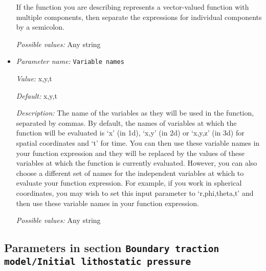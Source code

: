 \begin{itemize}
If the function you are describing represents a vector-valued function with multiple components, then separate the expressions for individual components by a semicolon.


{\it Possible values:} Any string
\item {\it Parameter name:} {\tt Variable names}
\label{parameters:Boundary traction model/Function/Variable names}


{\it Value:} x,y,t


{\it Default:} x,y,t


{\it Description:} The name of the variables as they will be used in the function, separated by commas. By default, the names of variables at which the function will be evaluated is `x' (in 1d), `x,y' (in 2d) or `x,y,z' (in 3d) for spatial coordinates and `t' for time. You can then use these variable names in your function expression and they will be replaced by the values of these variables at which the function is currently evaluated. However, you can also choose a different set of names for the independent variables at which to evaluate your function expression. For example, if you work in spherical coordinates, you may wish to set this input parameter to `r,phi,theta,t' and then use these variable names in your function expression.


{\it Possible values:} Any string
\end{itemize}

\subsection{Parameters in section \tt Boundary traction model/Initial lithostatic pressure}
\label{parameters:Boundary_20traction_20model/Initial_20lithostatic_20pressure}

